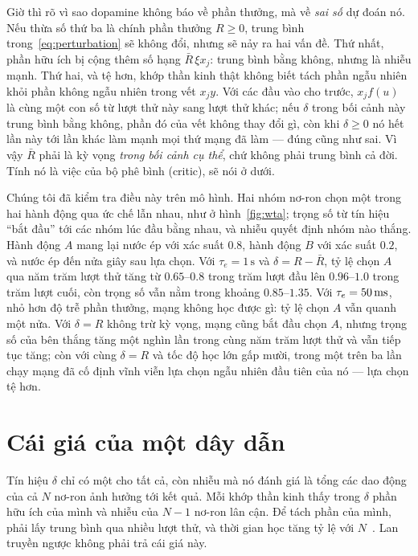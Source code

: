 Giờ thì rõ vì sao dopamine không báo về phần thưởng, mà về \emph{sai số} dự đoán nó. Nếu thừa số thứ ba là chính phần thưởng $R\ge0$, trung bình trong~\eqref{eq:perturbation} sẽ không đổi, nhưng sẽ nảy ra hai vấn đề. Thứ nhất, phần hữu ích bị cộng thêm số hạng $\bar R\,\xi x_j$: trung bình bằng không, nhưng là nhiễu mạnh. Thứ hai, và tệ hơn, khớp thần kinh thật không biết tách phần ngẫu nhiên khỏi phần không ngẫu nhiên trong vết $x_jy$. Với các đầu vào cho trước, $x_jf(u)$ là cùng một con số từ lượt thử này sang lượt thử khác; nếu $\delta$ trong bối cảnh này trung bình bằng không, phần đó của vết không thay đổi gì, còn khi $\delta\ge0$ nó hết lần này tới lần khác làm mạnh mọi thứ mạng đã làm --- đúng cũng như sai. Vì vậy $\bar R$ phải là kỳ vọng \emph{trong bối cảnh cụ thể}, chứ không phải trung bình cả đời. Tính nó là việc của bộ phê bình (critic), sẽ nói ở dưới.

Chúng tôi đã kiểm tra điều này trên mô hình. Hai nhóm nơ-ron  chọn một trong hai hành động qua ức chế lẫn nhau, như ở hình~\ref{fig:wta}; trọng số từ tín hiệu ``bắt đầu'' tới các nhóm lúc đầu bằng nhau, và nhiễu quyết định nhóm nào thắng. Hành động $A$ mang lại nước ép với xác suất $0.8$, hành động $B$ với xác suất $0.2$, và nước ép đến nửa giây sau lựa chọn. Với $\tau_e=1\,\text{s}$ và $\delta=R-\bar R$, tỷ lệ chọn $A$ qua năm trăm lượt thử tăng từ $0.65$--$0.8$ trong trăm lượt đầu lên $0.96$--$1.0$ trong trăm lượt cuối, còn trọng số vẫn nằm trong khoảng $0.85$--$1.35$. Với $\tau_e=50\,\text{ms}$, nhỏ hơn độ trễ phần thưởng, mạng không học được gì: tỷ lệ chọn $A$ vẫn quanh một nửa. Với $\delta=R$ không trừ kỳ vọng, mạng cũng bắt đầu chọn $A$, nhưng trọng số của bên thắng tăng một nghìn lần trong cùng năm trăm lượt thử và vẫn tiếp tục tăng; còn với cùng $\delta=R$ và tốc độ học lớn gấp mười, trong một trên ba lần chạy mạng đã cố định vĩnh viễn lựa chọn ngẫu nhiên đầu tiên của nó --- lựa chọn tệ hơn.

\section{Cái giá của một dây dẫn}

Tín hiệu $\delta$ chỉ có một cho tất cả, còn nhiễu mà nó đánh giá là tổng các dao động của cả $N$ nơ-ron ảnh hưởng tới kết quả. Mỗi khớp thần kinh thấy trong $\delta$ phần hữu ích của mình và nhiễu của $N-1$ nơ-ron lân cận. Để tách phần của mình, phải lấy trung bình qua nhiều lượt thử, và thời gian học tăng tỷ lệ với $N$~\cite{Werfel2005}. Lan truyền ngược không phải trả cái giá này.

